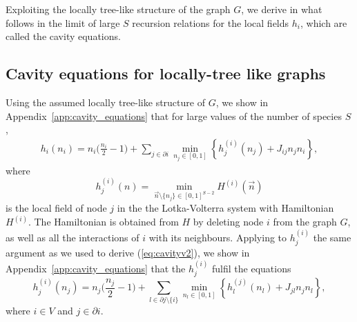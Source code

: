 \documentclass[11pt,a4paper]{article}
\begin{document}
Exploiting the locally tree-like structure of the graph $G$, we derive in what follows  in the limit of large $S$  recursion relations for the local fields $h_i$, which are called the cavity equations.


\subsection{Cavity equations for locally-tree like graphs} 
Using the assumed locally tree-like structure of $G$, we show in Appendix~\ref{app:cavity_equations} that for large values of the number of species $S$,  
\begin{eqnarray}
   h_i(n_i)
    = n_i \bigg( \frac{n_i}{2} - 1 \bigg)
      + \sum_{j\in \partial i}
        \min_{n_j \in [0,1]}
        \left\{h^{(i)}_j(n_j) + J_{ij} n_j n_i\right\},
    \label{eq:cavityv2}
\end{eqnarray} 
where 
\begin{equation}
h^{(i)}_j(n) =  \min_{\vec n \setminus \{n_j\} \in [0,1]^{S-2}} H^{(i)}(\vec n)
\end{equation}
is the local field of node $j$ in the the Lotka-Volterra system  with Hamiltonian 
 $H^{(i)}$.    The Hamiltonian is  obtained from $H$ by deleting node $i$ from the graph $G$,  as well as    all the  interactions of $i$ with its neighbours.   Applying  to $h^{(i)}_j$ the same argument as we used to derive (\ref{eq:cavityv2}), we show in Appendix~\ref{app:cavity_equations}  that the $h^{(i)}_j$ fulfil the equations
\begin{equation}
    h^{(i)}_j(n_j)
    = n_j \bigg( \frac{n_j}{2} - 1 \bigg)
      + \sum_{l\in \partial j \setminus \{ i \}}
        \min_{n_l \in [0,1]}
        \left\{h^{(j)}_l(n_l) + J_{jl} n_j n_l\right\},
    \label{eq:cavity}
\end{equation}
where $i\in V$ and $j\in \partial i$. 
\end{document}
